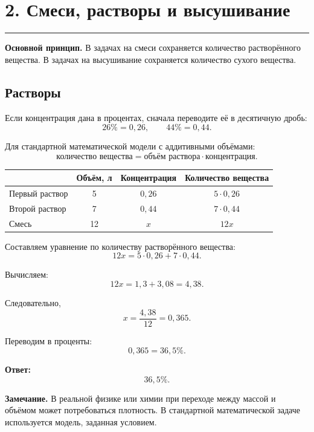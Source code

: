 \documentclass[a4paper,12pt]{article}
\newcommand{\sectionrule}{%
  \par
  \vspace{-0.35em}%
  {\color{accent}\rule{\linewidth}{0.6pt}}%
  \vspace{0.6em}%
}
\newcommand{\key}[1]{\textcolor{darkaccent}{\textbf{#1}}}
\begin{document}

\section*{2. Смеси, растворы и высушивание}
\sectionrule

\key{Основной принцип.}
В задачах на смеси сохраняется количество растворённого вещества.
В задачах на высушивание сохраняется количество сухого вещества.

\subsection*{Растворы}

Если концентрация дана в процентах, сначала переводите её
в десятичную дробь:
\[
26\%=0{,}26,
\qquad
44\%=0{,}44.
\]

Для стандартной математической модели с аддитивными объёмами:
\[
\text{количество вещества}
=
\text{объём раствора}
\cdot
\text{концентрация}.
\]

\begin{table}[h!]
\centering
\renewcommand{\arraystretch}{1.35}

\begin{tabularx}{\linewidth}{X c c c}
\toprule
&
Объём, л
&
Концентрация
&
Количество вещества
\\
\midrule

Первый раствор
&
5
&
\(0{,}26\)
&
\(5\cdot0{,}26\)
\\

Второй раствор
&
7
&
\(0{,}44\)
&
\(7\cdot0{,}44\)
\\

Смесь
&
12
&
\(x\)
&
\(12x\)
\\

\bottomrule
\end{tabularx}
\end{table}

Составляем уравнение по количеству растворённого вещества:
\[
12x
=
5\cdot0{,}26
+
7\cdot0{,}44.
\]

Вычисляем:
\[
12x=1{,}3+3{,}08=4{,}38.
\]

Следовательно,
\[
x=\frac{4{,}38}{12}=0{,}365.
\]

Переводим в проценты:
\[
0{,}365=36{,}5\%.
\]

\key{Ответ:}
\[
36{,}5\%.
\]

\textbf{Замечание.}
В реальной физике или химии при переходе между массой и объёмом
может потребоваться плотность. В стандартной математической задаче
используется модель, заданная условием.
\end{document}
